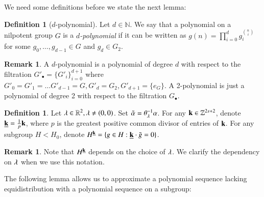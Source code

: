 \documentclass[12pt,amstex]{amsart}
\theoremstyle{definition}
\newtheorem{defn}[thm]{Definition}
\newtheorem{rem}[thm]{Remark}
\def \A {\alpha}
\def \k {\bold{k}}
\def \l {\bold{\lambda}}
\begin{document}
We need some definitions before we state the next lemma:

\begin{defn}[$d$-polynomial]
  Let $d\in\mathbb{N}$. We say that a polynomial on a nilpotent group $G$ is a \emph{$d$-polynomial} if it can be written as
$g(n)=\prod_{i=0}^{d}g_{i}^{\binom{n}{i}}$ for some $g_{0},\dots,g_{d-1}\in G$ and $g_{d}\in G_{2}$.
\end{defn}
\begin{rem}
 A $d$-polynomial is a polynomial of degree $d$ with respect to the filtration $G'_{\bullet}=\{G'_{i}\}_{i=0}^{d+1}$ where $G'_{0}=G'_{1}=\dots G'_{d-1}=G, G'_{d}=G_{2}, G'_{d+1}=\{e_{G}\}$.
 A 2-polynomial is just a polynomial of degree 2 with respect to the filtration $G_{\bullet}$.
\end{rem}


\begin{defn}\label{subgroup}\label{sg}
  Let $\l\in\mathbb{R}^{2}, \l\neq(0,0)$. Set $\tilde{\A}=\theta^{-1}_{\l}\A$.
  For any $\k\in\mathbb{Z}^{2s+2}$, denote $\underline{\k}=\frac{1}{p}\k$, where $p$ is the greatest positive common divisor of entries of $\k$.
  For any subgroup $H<H_{0}$, denote $H^{\underline{\k}}=\{g\in H: \underline{\k}\cdot \tilde{g}=0\}$.
\end{defn}

\begin{rem}
 Note that $H^{\underline{\k}}$ depends on the choice of $\l$. We clarify the dependency on $\l$ when we use this notation.
\end{rem}

The following lemma allows us to approximate a polynomial sequence lacking equidistribution with a polynomial sequence on a subgroup:
\end{document}
